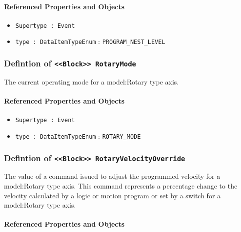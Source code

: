\FloatBarrier
\paragraph{Referenced Properties and Objects}

\begin{itemize}
\item \texttt{Supertype : Event}

\item \texttt{type : DataItemTypeEnum} : \texttt{PROGRAM_NEST_LEVEL}

\end{itemize}
\FloatBarrier
\subsubsection{Defintion of \texttt{<<Block>> RotaryMode}}
  \label{type:RotaryMode}

\FloatBarrier

The current operating mode for a {model:Rotary} type axis.

\FloatBarrier
\paragraph{Referenced Properties and Objects}

\begin{itemize}
\item \texttt{Supertype : Event}

\item \texttt{type : DataItemTypeEnum} : \texttt{ROTARY_MODE}

\end{itemize}
\FloatBarrier
\subsubsection{Defintion of \texttt{<<Block>> RotaryVelocityOverride}}
  \label{type:RotaryVelocityOverride}

\FloatBarrier

The value of a command issued to adjust the programmed velocity for a {model:Rotary} type axis.
 This command represents a percentage change to the velocity calculated by a logic or motion program or set by a switch for a {model:Rotary} type axis.

\FloatBarrier
\paragraph{Referenced Properties and Objects}

